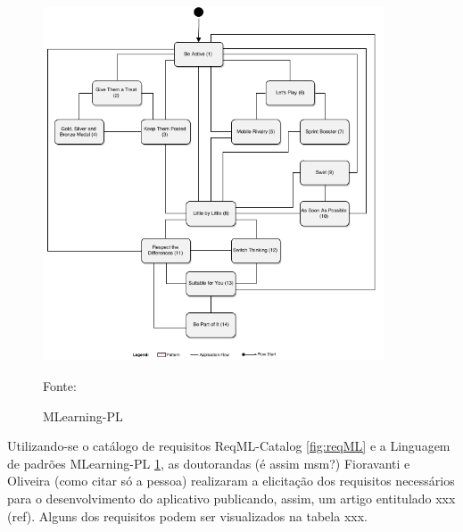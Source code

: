 \begin{figure}[H]
\centering
    \caption{MLearning-PL}
    \label{fig:ml-pl}
    \includegraphics[width=0.9\textwidth]{Figuras/mlearning-pl.png}
    
    Fonte: \cite{Fioravanti2017_plop}
\end{figure}

Utilizando-se o catálogo de requisitos ReqML-Catalog \ref{fig:reqML} e a Linguagem de padrões MLearning-PL \ref{fig:ml-pl}, as doutorandas (é assim msm?) Fioravanti e Oliveira (como citar só a pessoa) realizaram a elicitação dos requisitos necessários para o desenvolvimento do aplicativo publicando, assim,  um artigo entitulado xxx (ref). Alguns dos requisitos podem ser visualizados na tabela xxx.


